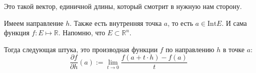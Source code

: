 

	
\begin{definition}[Направление] \thmslashn
		
	Это такой вектор, единичной длины, который смотрит в нужную нам сторону.  	
		
\end{definition}

\begin{definition} \thmslashn
	
	Имеем направление $ h $. Также есть внутренняя точка $ a $, то есть $ a \in \mathrm{Int} E $. И сама функция $ f : E \mapsto \mathbb{R} $. Напомню, что $ E \subset \mathbb{R}^n $. 
	
	Тогда следующая штука, это производная функции $ f $ по направлению $ h $ в точке $ a $:
	\[
	\frac{\partial f}{\partial h} (a) := \lim_{t \to 0} \frac{f(a + t \cdot h) - f(a)}{t}
	\]

\end{definition}

